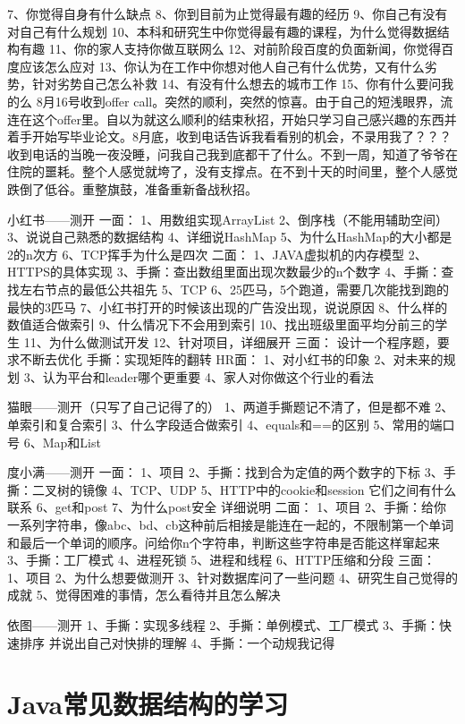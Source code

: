 \documentclass[UTF8]{ctexart}
\begin{document}
7、你觉得自身有什么缺点
8、你到目前为止觉得最有趣的经历
9、你自己有没有对自己有什么规划
10、本科和研究生中你觉得最有趣的课程，为什么觉得数据结构有趣
11、你的家人支持你做互联网么
12、对前阶段百度的负面新闻，你觉得百度应该怎么应对
13、你认为在工作中你想对他人自己有什么优势，又有什么劣势，针对劣势自己怎么补救
14、有没有什么想去的城市工作
15、你有什么要问我的么
8月16号收到offer call。突然的顺利，突然的惊喜。由于自己的短浅眼界，流连在这个offer里。自以为就这么顺利的结束秋招，开始只学习自己感兴趣的东西并着手开始写毕业论文。8月底，收到电话告诉我看看别的机会，不录用我了？？？收到电话的当晚一夜没睡，问我自己我到底都干了什么。不到一周，知道了爷爷在住院的噩耗。整个人感觉就垮了，没有支撑点。在不到十天的时间里，整个人感觉跌倒了低谷。重整旗鼓，准备重新备战秋招。

小红书——测开
一面：
1、用数组实现ArrayList
2、倒序栈（不能用辅助空间）
3、说说自己熟悉的数据结构
4、详细说HashMap
5、为什么HashMap的大小都是2的n次方
6、TCP挥手为什么是四次
二面：
1、JAVA虚拟机的内存模型
2、HTTPS的具体实现
3、手撕：查出数组里面出现次数最少的n个数字
4、手撕：查找左右节点的最低公共祖先
5、TCP
6、25匹马，5个跑道，需要几次能找到跑的最快的3匹马
7、小红书打开的时候该出现的广告没出现，说说原因
8、什么样的数值适合做索引
9、什么情况下不会用到索引
10、找出班级里面平均分前三的学生
11、为什么做测试开发
12、针对项目，详细展开
三面：
设计一个程序题，要求不断去优化
手撕：实现矩阵的翻转
HR面：
1、对小红书的印象
2、对未来的规划
3、认为平台和leader哪个更重要
4、家人对你做这个行业的看法

猫眼——测开（只写了自己记得了的）
1、两道手撕题记不清了，但是都不难
2、单索引和复合索引
3、什么字段适合做索引
4、equals和==的区别
5、常用的端口号
6、Map和List

度小满——测开
一面：
1、项目
2、手撕：找到合为定值的两个数字的下标
3、手撕：二叉树的镜像
4、TCP、UDP
5、HTTP中的cookie和session 它们之间有什么联系
6、get和post
7、为什么post安全 详细说明
二面：
1、项目
2、手撕：给你一系列字符串，像abc、bd、cb这种前后相接是能连在一起的，不限制第一个单词和最后一个单词的顺序。问给你n个字符串，判断这些字符串是否能这样窜起来
3、手撕：工厂模式
4、进程死锁
5、进程和线程
6、HTTP压缩和分段
三面：
1、项目
2、为什么想要做测开
3、针对数据库问了一些问题
4、研究生自己觉得的成就
5、觉得困难的事情，怎么看待并且怎么解决

依图——测开
1、手撕：实现多线程
2、手撕：单例模式、工厂模式
3、手撕：快速排序 并说出自己对快排的理解
4、手撕：一个动规我记得

\section{Java常见数据结构的学习}
\end{document}
